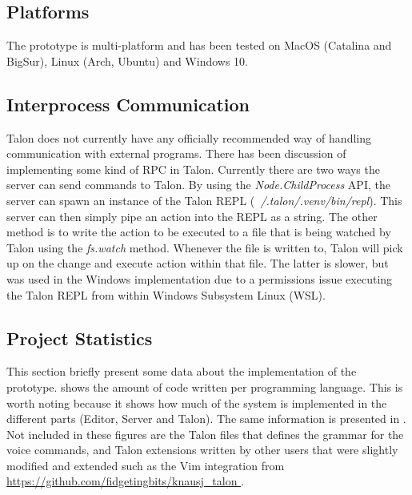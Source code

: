 \documentclass[../thesis.tex]{subfiles}
\begin{document}
\subsection{Platforms}
The prototype is multi-platform and has been tested on MacOS (Catalina and BigSur), Linux (Arch, Ubuntu) and Windows 10.

\subsection{Interprocess Communication}
Talon does not currently have any officially recommended way of handling communication with external programs.
There has been discussion of implementing some kind of RPC in Talon.
Currently there are two ways the server can send commands to Talon.
By using the \textit{Node.ChildProcess} API, the server can spawn an instance of the Talon REPL (\textit{~/.talon/.venv/bin/repl}).
This server can then simply pipe an action into the REPL as a string.
The other method is to write the action to be executed to a file that is being watched by Talon using the \textit{fs.watch}
method. Whenever the file is written to, Talon will pick up on the change and execute action within that file.
The latter is slower, but was used in the Windows implementation due to a permissions issue executing the Talon REPL from within Windows Subsystem Linux (WSL).



\subsection{Project Statistics}%
\label{sub:project_statistics}
This section briefly present some data about the implementation of the prototype.
 shows the amount of code written per programming language.
This is worth noting because it shows how much of the system is implemented in the different parts
(Editor, Server and Talon).
The same information is presented in .
Not included in these figures are the Talon files that defines the grammar for the voice commands,
and Talon extensions written by other users that were slightly modified and extended such as the Vim integration from \url{https://github.com/fidgetingbits/knausj_talon
}.

%   
\end{document}
